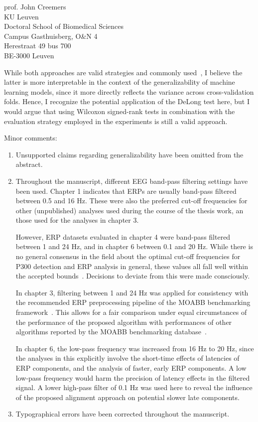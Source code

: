 \documentclass{letter}
\begin{document}
\begin{letter}{%
	prof. John Creemers \\
	KU Leuven \\
	Doctoral School of Biomedical Sciences \\
	Campus Gasthuisberg, O\&N 4 \\
	Herestraat 49 bus 700 \\
	BE-3000 Leuven

}
\begin{enumerate}
    While both approaches are valid strategies and commonly used~\cite{Rainio2024}, I believe
    the latter is more interpretable in the context of the generalizability
    of machine learning models, since it more directly reflects the variance
    across cross-validation folds.
    Hence, I recognize the potential application of the DeLong test here,
    but I would argue that using Wilcoxon signed-rank tests in combination with
    the evaluation strategy employed in the experiments is still a valid approach.
   \end{enumerate}
Minor comments:
\begin{enumerate}
	\item Unsupported claims regarding generalizability have been omitted
	from the abstract.
	\item Throughout the manuscript, different EEG band-pass filtering
	settings have been used.
	Chapter 1 indicates that ERPs are usually band-pass filtered between
	0.5 and 16 Hz.
	These were also the preferred cut-off frequencies for other
	(unpublished) analyses used during the course of the thesis work, an
	those used for the analyses in chapter 3.

	However, ERP datasets evaluated in chapter 4 were band-pass filtered
	between 1 and 24 Hz, and in chapter 6 between 0.1 and 20 Hz.
	While there is no general consensus in the field about the optimal
	cut-off frequencies for P300 detection and ERP analysis in general,
	these values all fall well within the accepted
	bounds~\cite{Bougrain2012}.
	Decisions to deviate from this were made consciously.

	In chapter 3, filtering between 1 and 24 Hz was applied for consistency
	with the recommended ERP preprocessing pipeline of the MOABB
	benchmarking framework~\cite{Aristimunha2023}.
	This allows for a fair comparison under equal circumstances of the
	performance of the proposed algorithm with performances of other
	algorithms reported by the MOABB benchmarking
	database~\cite{Chevallier2024}.

	In chapter 6, the low-pass frequency was increased from 16 Hz to 20 Hz,
	since the analyses in this explicitly involve the short-time effects of
	latencies of ERP components, and the analysis of faster, early ERP
	components. A low low-pass frequency would harm the precision of
	latency effects in the filtered signal.
	A lower high-pass filter of 0.1 Hz was used here to reveal the
	influence of the proposed alignment approach on potential
	slower late components.
	\item Typographical errors have been corrected throughout the
	manuscript.
\end{enumerate}


\end{letter}
\end{document}
